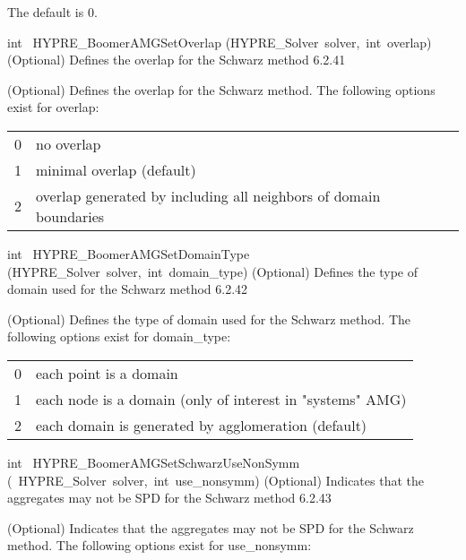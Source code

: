 \documentclass{article}
\begin{document}
\begin{cxxentry}
\begin{cxxentry}
\begin{cxxfunction}
\begin{cxxdoc}
The default is 0.
\end{cxxdoc}
\end{cxxfunction}
\begin{cxxfunction}
{int\ }
        {HYPRE\_BoomerAMGSetOverlap}
        {(HYPRE\_Solver\ solver,\ int\ overlap)}
        {
(Optional) Defines the overlap for the Schwarz method}
        {6.2.41}
\begin{cxxdoc}

(Optional) Defines the overlap for the Schwarz method.
The following options exist for overlap:

\begin{tabular}{|c|l|} \hline
0  & no overlap \\
1  & minimal overlap (default) \\
2  & overlap generated by including all neighbors of domain boundaries \\
\hline
\end{tabular}
\end{cxxdoc}
\end{cxxfunction}
\begin{cxxfunction}
{int\ }
        {HYPRE\_BoomerAMGSetDomainType}
        {(HYPRE\_Solver\ solver,\ int\ domain\_type)}
        {
(Optional) Defines the type of domain used for the Schwarz method}
        {6.2.42}
\begin{cxxdoc}

(Optional) Defines the type of domain used for the Schwarz method.
The following options exist for domain\_type:

\begin{tabular}{|c|l|} \hline
0 &  each point is a domain \\
1 &  each node is a domain (only of interest in "systems" AMG) \\
2 &  each domain is generated by agglomeration (default) \\
\hline
\end{tabular}
\end{cxxdoc}
\end{cxxfunction}
\begin{cxxfunction}
{int\ }
        {HYPRE\_BoomerAMGSetSchwarzUseNonSymm}
        {(\ HYPRE\_Solver\ solver,\ int\ use\_nonsymm)}
        {
(Optional) Indicates that the aggregates may not be SPD for the Schwarz method}
        {6.2.43}
\begin{cxxdoc}

(Optional) Indicates that the aggregates may not be SPD for the Schwarz method.
The following options exist for use\_nonsymm:


\end{cxxdoc}
\end{cxxfunction}
\end{cxxentry}
\end{cxxentry}
\end{document}
